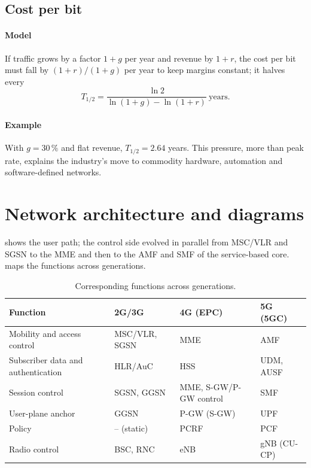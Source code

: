 \documentclass[11pt,a4paper]{article}
\begin{document}
\subsection{Cost per bit}\label{sec:cost}
\paragraph{Model} If traffic grows by a factor $1+g$ per year and revenue by $1+r$, the cost per bit must fall by $(1+r)/(1+g)$ per year to keep margins
constant; it halves every
\begin{equation}\label{eq:cost}
  T_{1/2} = \frac{\ln 2}{\ln (1+g) - \ln (1+r)} \ \text{years}.
\end{equation}
\paragraph{Example} With $g = 30\,\%$ and flat revenue, $T_{1/2} = 2.64$ years. This pressure, more than peak rate, explains the industry's move to
commodity hardware, automation and software-defined networks.

\section{Network architecture and diagrams}
 shows the user path; the control side evolved in parallel from MSC/VLR and SGSN to the MME and then to the AMF and SMF of the
service-based core.  maps the functions across generations.

\begin{table}[htbp]
\centering\small
\caption{Corresponding functions across generations.}\label{tab:map}
\begin{tabularx}{\linewidth}{@{}l Y Y Y@{}}
\toprule
{} Function & 2G/3G & 4G (EPC) & 5G (5GC) \\
\midrule
Mobility and access control & MSC/VLR, SGSN & MME & AMF \\
Subscriber data and authentication & HLR/AuC & HSS & UDM, AUSF \\
Session control & SGSN, GGSN & MME, S-GW/P-GW control & SMF \\
User-plane anchor & GGSN & P-GW (S-GW) & UPF \\
Policy & -- (static) & PCRF & PCF \\
Radio control & BSC, RNC & eNB & gNB (CU-CP) \\
\bottomrule
\end{tabularx}
\end{table}
\end{document}
